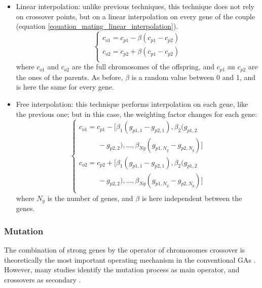 \documentclass{ametsoc}
\begin{document}
\begin{itemize}
	\item Linear interpolation: unlike previous techniques, this technique does not rely on crossover points, but on a linear interpolation on every gene of the couple (equation \ref{equation_mating_linear_interpolation}).
	\begin{equation}
	\left\lbrace \begin{array}{l} 
	c_{o1} = c_{p1} - \beta (c_{p1} - c_{p2}) \\
	c_{o2} = c_{p2} + \beta (c_{p1} - c_{p2}) \\
	\end{array} \right.
	\label{equation_mating_linear_interpolation}
	\end{equation}
	where $c_{o1}$ and $c_{o2}$ are the full chromosomes of the offspring, and $c_{p1}$ an $c_{p2}$ are the ones of the parents. As before, $\beta$ is a random value between 0 and 1, and is here the same for every gene.
	
	\item Free interpolation: this technique performs interpolation on each gene, like the previous one; but in this case, the weighting factor changes for each gene:
	\begin{equation}
	\left\lbrace \begin{array}{l} 
	c_{o1} = c_{p1} - [\beta_{1} (g_{p1,1} - g_{p2,1}), \beta_{2} (g_{p1,2}\\
	~~~~~~~~~~~~ - g_{p2,2}), ..., \beta_{Ng} (g_{p1,N_{g}} - g_{p2,N_{g}})] \\
	c_{o2} = c_{p2} + [\beta_{1} (g_{p1,1} - g_{p2,1}), \beta_{2} (g_{p1,2}\\
	~~~~~~~~~~~~ - g_{p2,2}), ..., \beta_{Ng} (g_{p1,N_{g}} - g_{p2,N_{g}})] \\
	\end{array} \right.
	\label{equation_mating_free_interpolation}
	\end{equation}
	where $N_{g}$ is the number of genes, and $\beta$ is here independent between the genes.
	
\end{itemize}


\subsubsection{Mutation}
\label{sec:gas:mutation}

The combination of strong genes by the operator of chromosomes crossover is theoretically the most important operating mechanism in the conventional GAs \citep{Holland1992b,Back1993b}. However, many studies identify the mutation process as main operator, and crossovers as secondary \citep[see][]{Back1992a, Back1996a, Back1996b, Smith1997a, Deb1999, Costa2005a, Costa2007a}.
\end{document}
